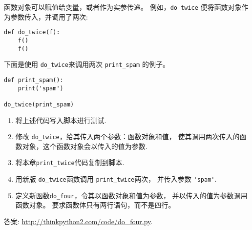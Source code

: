 \documentclass[10pt]{book}
\begin{document}
\begin{exercise}

函数对象可以赋值给变量，或者作为实参传递。
例如，\verb"do_twice" 便将函数对象作为参数传入，并调用了两次:

\begin{verbatim}
def do_twice(f):
    f()
    f()
\end{verbatim}

下面是使用 \verb"do_twice"来调用两次 \verb"print_spam" 的例子。

\begin{verbatim}
def print_spam():
    print('spam')

do_twice(print_spam)
\end{verbatim}

\begin{enumerate}

\item 将上述代码写入脚本进行测试.

\item 修改 \verb"do_twice"，给其传入两个参数：函数对象和值，
使其调用两次传入的函数对象，这个函数对象会以传入的值为参数.

\item 将本章\verb"print_twice"代码复制到脚本.

\item 用新版 \verb"do_twice"函数调用 \verb"print_twice"两次，
并传入参数 \verb"'spam'".

\item 定义新函数\verb"do_four"，令其以函数对象和值为参数，
并以传入的值为参数调用函数对象。
要求函数体只有两行语句，而不是四行。

\end{enumerate}

答案: \url{http://thinkpython2.com/code/do_four.py}.

\end{exercise}
\end{document}
